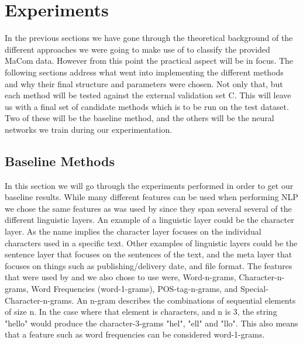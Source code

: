 \section{Experiments} \label{sec:experiments} 

In the previous sections we have gone through the theoretical background of
the different approaches we were going to make use of to classify the provided
MaCom data. However from this point the practical aspect will be in focus. The
following sections address what went into implementing the different methods and
why their final structure and parameters were chosen. Not only that, but each
method will be tested against the external validation set \gls{C}. This will
leave us with a final set of candidate methods which is to be run on the test
dataset. Two of these will be the baseline method, and the others will be the
neural networks we train during our experimentation.


\subsection{Baseline Methods} \label{subsec:baseline_methods}

In this section we will go through the experiments performed in order to get
our baseline results. While many different features can be used when performing
\gls{NLP} we chose the same features as was used by \citet{US} since they span
several several of the different linguistic layers. An example of a linguistic
layer could be the character layer. As the name implies the character layer
focuses on the individual characters used in a specific text. Other examples of
linguistic layers could be the sentence layer that focuses on the sentences of
the text, and the meta layer that focuses on things such as publishing/delivery
date, and file format. The features that were used by \citet{US} and we
also chose to use were, Word-n-grams, Character-n-grams, Word Frequencies
(word-1-grams), \gls{POS}-tag-n-grams, and Special-Character-n-grams. An n-gram
describes the combinations of sequential elements of size n. In the case where
that element is characters, and n is 3, the string "hello" would produce the
character-3-grams "hel", "ell" and "llo". This also means that a feature such as
word frequencies can be considered word-1-grams.


